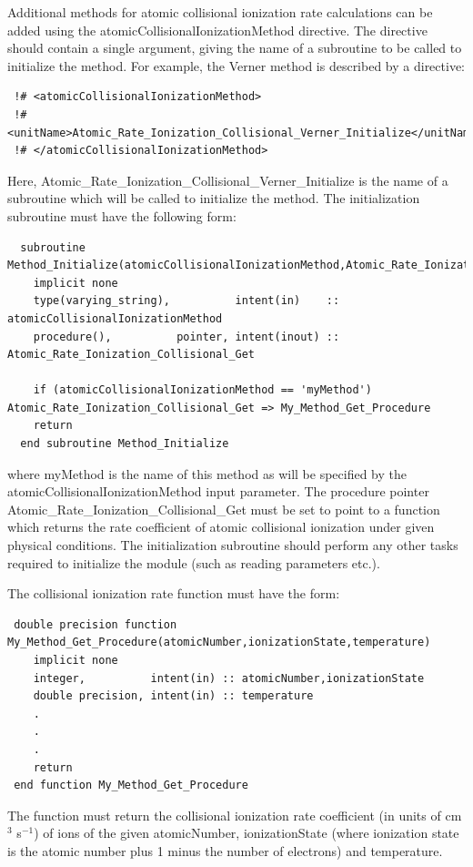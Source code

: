 Additional methods for atomic collisional ionization rate calculations can be added using the {\normalfont \ttfamily atomicCollisionalIonizationMethod} directive. The directive should contain a single argument, giving the name of a subroutine to be called to initialize the method. For example, the {\normalfont \ttfamily Verner} method is described by a directive:
\begin{verbatim}
 !# <atomicCollisionalIonizationMethod>
 !#  <unitName>Atomic_Rate_Ionization_Collisional_Verner_Initialize</unitName>
 !# </atomicCollisionalIonizationMethod>
\end{verbatim}
Here, {\normalfont \ttfamily Atomic\_Rate\_Ionization\_Collisional\_Verner\_Initialize} is the name of a subroutine which will be called to initialize the method. The initialization subroutine must have the following form:
\begin{verbatim}
  subroutine Method_Initialize(atomicCollisionalIonizationMethod,Atomic_Rate_Ionization_Collisional_Get)
    implicit none
    type(varying_string),          intent(in)    :: atomicCollisionalIonizationMethod
    procedure(),          pointer, intent(inout) :: Atomic_Rate_Ionization_Collisional_Get
    
    if (atomicCollisionalIonizationMethod == 'myMethod') Atomic_Rate_Ionization_Collisional_Get => My_Method_Get_Procedure
    return
  end subroutine Method_Initialize
\end{verbatim}
where {\normalfont \ttfamily myMethod} is the name of this method as will be specified by the {\normalfont \ttfamily atomicCollisionalIonizationMethod} input parameter. The procedure pointer {\normalfont \ttfamily Atomic\_Rate\_Ionization\_Collisional\_Get} must be set to point to a function which returns the rate coefficient of atomic collisional ionization under given physical conditions. The initialization subroutine should perform any other tasks required to initialize the module (such as reading parameters etc.).

The collisional ionization rate function must have the form:
\begin{verbatim}
 double precision function My_Method_Get_Procedure(atomicNumber,ionizationState,temperature)
    implicit none
    integer,          intent(in) :: atomicNumber,ionizationState
    double precision, intent(in) :: temperature
    .
    .
    .
    return
 end function My_Method_Get_Procedure
\end{verbatim}
The function must return the collisional ionization rate coefficient (in units of cm$^3$ s$^{-1}$) of ions of the given {\normalfont \ttfamily atomicNumber}, {\normalfont \ttfamily ionizationState} (where ionization state is the atomic number plus 1 minus the number of electrons) and {\normalfont \ttfamily temperature}.


